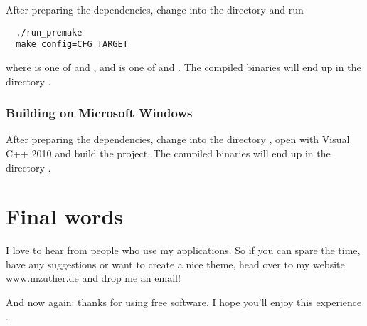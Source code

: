 After preparing the dependencies, change into the directory  and
run

\begin{verbatim}
  ./run_premake
  make config=CFG TARGET
\end{verbatim}

where  is one of  and
, and  is one of
 and .  The
compiled binaries will end up in the directory .

\subsubsection{Building on Microsoft Windows}

After preparing the dependencies, change into the directory
, open  with Visual C++
2010 and build the project.  The compiled binaries will end up in the
directory .

\section{Final words}

I love to hear from people who use my applications.  So if you can
spare the time, have any suggestions or want to create a nice theme,
head over to my website \href{http://www.mzuther.de/}{www.mzuther.de}
and drop me an email!

And now again: thanks for using free software.  I hope you'll enjoy
this experience \dots




